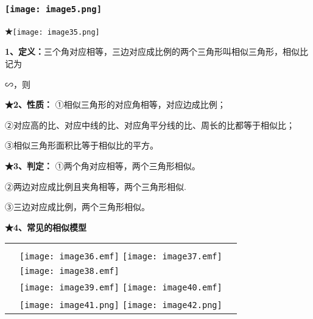 \hypertarget{ux5b66ux79d1ux7f51www.zxxk.com--ux6559ux80b2ux8d44ux6e90ux95e8ux6237ux63d0ux4f9bux8bd5ux9898ux8bd5ux5377ux6559ux6848ux8bfeux4ef6ux6559ux5b66ux8bbaux6587ux7d20ux6750ux7b49ux5404ux7c7bux6559ux5b66ux8d44ux6e90ux5e93ux4e0bux8f7dux8fd8ux6709ux5927ux91cfux4e30ux5bccux7684ux6559ux5b66ux8d44ux8baf-11}{%
\subsubsection{\texorpdfstring{\protect\texttt{[image: image5.png]}}{学科网(www.zxxk.com)-\/-教育资源门户，提供试题试卷、教案、课件、教学论文、素材等各类教学资源库下载，还有大量丰富的教学资讯！}}\label{ux5b66ux79d1ux7f51www.zxxk.com--ux6559ux80b2ux8d44ux6e90ux95e8ux6237ux63d0ux4f9bux8bd5ux9898ux8bd5ux5377ux6559ux6848ux8bfeux4ef6ux6559ux5b66ux8bbaux6587ux7d20ux6750ux7b49ux5404ux7c7bux6559ux5b66ux8d44ux6e90ux5e93ux4e0bux8f7dux8fd8ux6709ux5927ux91cfux4e30ux5bccux7684ux6559ux5b66ux8d44ux8baf-11}}

\textbf{★}\texttt{[image: image35.png]}

\textbf{1、定义：}三个角对应相等，三边对应成比例的两个三角形叫相似三角形，相似比记为

∽，则

\textbf{★2、性质：} ①相似三角形的对应角相等，对应边成比例；

②对应高的比、对应中线的比、对应角平分线的比、周长的比都等于相似比；

③相似三角形面积比等于相似比的平方。

\textbf{★3、判定：} ①两个角对应相等，两个三角形相似。

②两边对应成比例且夹角相等，两个三角形相似.

③三边对应成比例，两个三角形相似。

\textbf{★4、常见的相似模型}

\begin{longtable}[]{@{}lll@{}}
\toprule
\endhead
& &\tabularnewline
& \texttt{[image: image36.emf]}
\texttt{[image: image37.emf]}
&\tabularnewline
&
\texttt{[image: image38.emf]}
&\tabularnewline
&
\texttt{[image: image39.emf]}
\texttt{[image: image40.emf]}
&\tabularnewline
&
\texttt{[image: image41.png]}
\texttt{[image: image42.png]}
&\tabularnewline
\bottomrule
\end{longtable}

